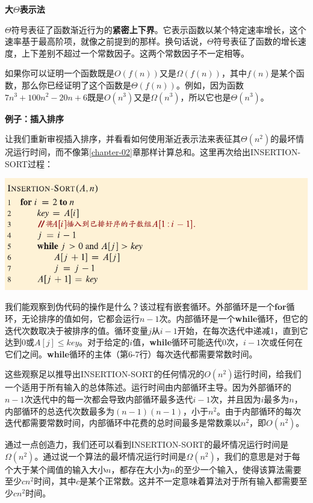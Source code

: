 \documentclass[lang=cn,newtx,10pt,scheme=chinese]{elegantbook}
\begin{document}
\textbf{大$\Theta$表示法}

$\Theta$符号表征了函数渐近行为的\textbf{紧密上下界}。它表示函数以某个特定速率增长，这个速率基于最高阶项，就像之前提到的那样。换句话说，$\Theta$符号表征了函数的增长速度，上下差别不超过一个常数因子。这两个常数因子不一定相等。

如果你可以证明一个函数既是$O(f(n))$又是$\Omega(f(n))$，其中$f(n)$是某个函数，那么你已经证明了这个函数是$\Theta(f(n))$。例如，因为函数$7 n^3+100 n^2-20 n+6$既是$O(n^3)$又是$\Omega(n^3)$，所以它也是$\Theta(n^3)$。

\textbf{例子：插入排序}

让我们重新审视插入排序，并看看如何使用渐近表示法来表征其$\Theta(n^2)$的最坏情况运行时间，而不像第\ref{chapter-02}章那样计算总和。这里再次给出INSERTION-SORT过程：

\includegraphics{算法导论第四版插图/第二章/插入排序伪代码.pdf}

我们能观察到伪代码的操作是什么？该过程有嵌套循环。外部循环是一个\textbf{for}循环，无论排序的值如何，它都会运行$n-1$次。内部循环是一个\textbf{while}循环，但它的迭代次数取决于被排序的值。循环变量$j$从$i-1$开始，在每次迭代中递减1，直到它达到0或$A[j]\leq key$。对于给定的$i$值，\textbf{while}循环可能迭代0次，$i-1$次或任何在它们之间。\textbf{while}循环的主体（第6-7行）每次迭代都需要常数时间。

这些观察足以推导出INSERTION-SORT的任何情况的$O(n^2)$运行时间，给我们一个适用于所有输入的总体陈述。运行时间由内部循环主导。因为外部循环的$n-1$次迭代中的每一次都会导致内部循环最多迭代$i-1$次，并且因为$i$最多为$n$，内部循环的总迭代次数最多为$(n-1)(n-1)$，小于$n^2$。由于内部循环的每次迭代都需要常数时间，内部循环中花费的总时间最多是常数乘以$n^2$，即$O(n^2)$。

通过一点创造力，我们还可以看到INSERTION-SORT的最坏情况运行时间是$\Omega(n^2)$。通过说一个算法的最坏情况运行时间是$\Omega(n^2)$，我们的意思是对于每个大于某个阈值的输入大小$n$，都存在大小为$n$的至少一个输入，使得该算法需要至少$cn^2$时间，其中$c$是某个正常数。这并不一定意味着算法对于所有输入都需要至少$cn^2$时间。
\end{document}
